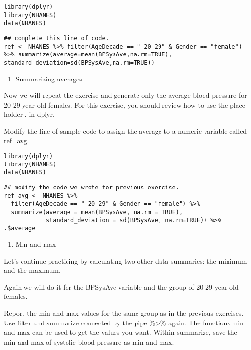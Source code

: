 \documentclass[]{article}
\providecommand{\tightlist}{%
  \setlength{\itemsep}{0pt}\setlength{\parskip}{0pt}}
\begin{document}
\begin{verbatim}
library(dplyr)
library(NHANES)
data(NHANES)
\end{verbatim}

\begin{verbatim}
## complete this line of code.
ref <- NHANES %>% filter(AgeDecade == " 20-29" & Gender == "female") %>% summarize(average=mean(BPSysAve,na.rm=TRUE), standard_deviation=sd(BPSysAve,na.rm=TRUE))
\end{verbatim}

\begin{enumerate}
\def\labelenumi{\arabic{enumi}.}
\setcounter{enumi}{2}
\tightlist
\item
  Summarizing averages
\end{enumerate}

Now we will repeat the exercise and generate only the average blood
pressure for 20-29 year old females. For this exercise, you should
review how to use the place holder . in dplyr.

Modify the line of sample code to assign the average to a numeric
variable called ref\_avg.

\begin{verbatim}
library(dplyr)
library(NHANES)
data(NHANES)
\end{verbatim}

\begin{verbatim}
## modify the code we wrote for previous exercise.
ref_avg <- NHANES %>%
  filter(AgeDecade == " 20-29" & Gender == "female") %>%
  summarize(average = mean(BPSysAve, na.rm = TRUE), 
            standard_deviation = sd(BPSysAve, na.rm=TRUE)) %>% .$average
\end{verbatim}

\begin{enumerate}
\def\labelenumi{\arabic{enumi}.}
\setcounter{enumi}{3}
\tightlist
\item
  Min and max
\end{enumerate}

Let's continue practicing by calculating two other data summaries: the
minimum and the maximum.

Again we will do it for the BPSysAve variable and the group of 20-29
year old females.

Report the min and max values for the same group as in the previous
exercises. Use filter and summarize connected by the pipe
\%\textgreater{}\% again. The functions min and max can be used to get
the values you want. Within summarize, save the min and max of systolic
blood pressure as min and max.
\end{document}
